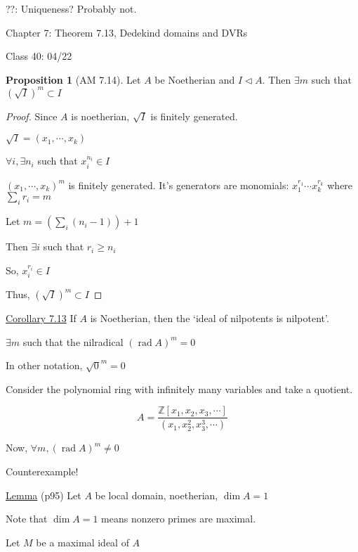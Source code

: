 \documentclass{article}
\theoremstyle{definition}
\newtheorem{proposition}{Proposition}
\begin{document}
??: Uniqueness? Probably not.

Chapter 7: Theorem 7.13, Dedekind domains and DVRs

\hrulefill

Class 40: 04/22

\begin{proposition}
    [AM 7.14]

    Let \(A\) be Noetherian and \(I \triangleleft A\). Then \(\exists m\) such that \((\sqrt{I})^m \subset I\)   
\end{proposition}

\begin{proof}
    
    Since \(A\) is noetherian, \(\sqrt{I}\) is finitely generated.

    \(\sqrt{I} = (x_1,\cdots, x_k)\) 

    \(\forall i, \exists n_i\) such that \(x_i^{n_i}\in I\) 

    \((x_1,\cdots,x_k)^m\) is finitely generated. It's generators are monomials: \(x_1^{r_1}\cdots x_k^{r_k}\) where \(\sum_{i} r_i = m\)
    
    Let \(m = (\sum_{i} (n_i - 1))+1\)
    
    Then \(\exists i\) such that \(r_i \geq n_i\)
    
    So, \(x_i^{r_i}\in I\)
    
    Thus, \((\sqrt{I})^m \subset I\) 

\end{proof}

\underline{Corollary 7.13} If \(A\) is Noetherian, then the `ideal of nilpotents is nilpotent'.

\(\exists m\) such that the nilradical \((\operatorname{rad} A)^m = 0\)  

In other notation, \(\sqrt{0}^m = 0\)

Consider the polynomial ring with infinitely many variables and take a quotient.

\[
    A = \frac{\mathbb{Z}[x_1, x_2, x_3,\cdots]}{(x_1, x_2^2, x_3^3,\cdots)}
\]

Now, \(\forall m, (\operatorname{rad} A)^m \neq 0\) 

Counterexample!

\underline{Lemma} (p95) Let \(A\) be local domain, noetherian, \(\dim A = 1\)

Note that \(\dim A = 1\) means nonzero primes are maximal.

Let \(M\) be a maximal ideal of \(A\) 
\end{document}
